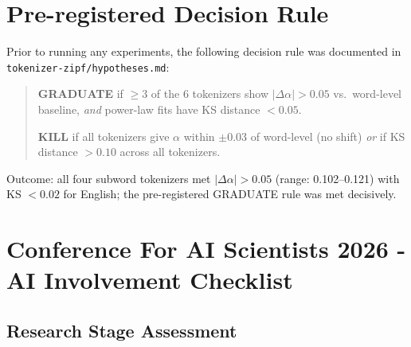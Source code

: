 \documentclass{article}
\begin{document}
\section{Pre-registered Decision Rule}
\label{app:prereg}

Prior to running any experiments, the following decision rule was documented in
\texttt{tokenizer-zipf/hypotheses.md}:

\begin{quote}
  \textbf{GRADUATE} if $\geq 3$ of the 6 tokenizers show $|\Delta\alpha| > 0.05$ vs.\
  word-level baseline, \emph{and} power-law fits have KS distance $< 0.05$.

  \textbf{KILL} if all tokenizers give $\alpha$ within $\pm 0.03$ of word-level (no shift)
  \emph{or} if KS distance $> 0.10$ across all tokenizers.
\end{quote}

Outcome: all four subword tokenizers met $|\Delta\alpha| > 0.05$ (range: 0.102--0.121) with
KS $< 0.02$ for English; the pre-registered GRADUATE rule was met decisively.


\newpage

\section*{Conference For AI Scientists 2026 - AI Involvement Checklist}
\label{checklist_ai_involvement}

\subsection*{Research Stage Assessment}
\end{document}
